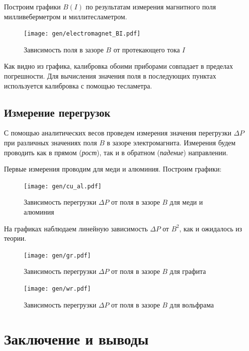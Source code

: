 \documentclass[12pt,a4paper]{article}
\begin{document}
	Построим графики $B(I)$ по результатам измерения магнитного поля милливеберметром и миллитесламетром.
	
	\begin{figure}[H]
		\texttt{[image: gen/electromagnet\_BI.pdf]}
		\caption{Зависимость поля в зазоре $B$ от протекающего тока $I$}
	\end{figure}
	
	Как видно из графика, калибровка обоими приборами совпадает в пределах погрешности. Для вычисления значения поля в последующих пунктах используется калибровка с помощью тесламетра.
	
	\subsection*{Измерение перегрузок}
	
	С помощью аналитических весов проведем измерения значения перегрузки $\Delta P$ при различных значениях поля $B$ в зазоре электромагнита. Измерения будем проводить как в прямом (\textit{рост}), так и в обратном (\textit{падение}) направлении.
	
	Первые измерения проводим для меди и алюминия. Построим графики:
	
	\begin{figure}[H]
		\texttt{[image: gen/cu\_al.pdf]}
		\caption{Зависимость перегрузки $\Delta P$ от поля в зазоре $B$ для меди и алюминия}
	\end{figure}
	
	На графиках наблюдаем линейную зависимость $\Delta P$ от $B^2$, как и ожидалось из теории.
	
	\begin{figure}[H]
		\texttt{[image: gen/gr.pdf]}
		\caption{Зависимость перегрузки $\Delta P$ от поля в зазоре $B$ для графита}
	\end{figure}
	
	\begin{figure}[H]
		\texttt{[image: gen/wr.pdf]}
		\caption{Зависимость перегрузки $\Delta P$ от поля в зазоре $B$ для вольфрама}
	\end{figure}
	
	\section*{Заключение и выводы}
	
	
\end{document}
